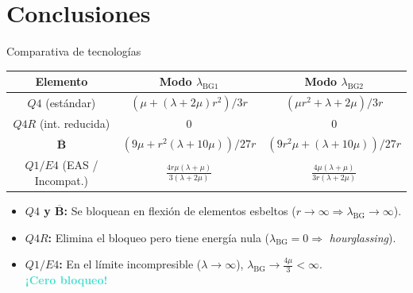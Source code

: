 \documentclass[10pt, aspectratio=43]{beamer}
\begin{document}
\section[Conclusiones]{Conclusiones}
\begin{frame}{Comparativa de tecnologías}
\begin{uicard}[title=Resumen de rigideces frente a flexión ($\lambda_{\text{BG}}$), top=2pt, bottom=3pt, left=6pt, right=6pt, attach title to upper={\par\vspace{0.05cm}}]
    \scriptsize
    \centering
    \renewcommand{\arraystretch}{1.8} %
    \begin{tabular}{||c|c|c||}
      \hline \hline
      Elemento & Modo $\lambda_{\text{BG1}}$ & Modo $\lambda_{\text{BG2}}$ \\ \hline \hline
      $Q4$ (estándar) & $(\mu + (\lambda+2\mu)r^2)/3r$ & $(\mu r^2 + \lambda+2\mu)/3r$ \\ \hline
      $Q4R$ (int. reducida) & $0$ & $0$ \\ \hline
      $\overline{\bm{B}}$ & $(9\mu + r^2(\lambda+10\mu))/27r$ & $(9r^2\mu + (\lambda+10\mu))/27r$ \\ \hline
      $Q1/E4$ (EAS / Incompat.) & $\frac{4r\mu(\lambda+\mu)}{3(\lambda+2\mu)}$ & $\frac{4\mu(\lambda+\mu)}{3r(\lambda+2\mu)}$ \\
      \hline \hline
    \end{tabular}
  \end{uicard}

  \vspace{0.05cm}

  \begin{uicard}[title=Diagnóstico final de rendimiento, top=2pt, bottom=3pt, left=6pt, right=6pt, attach title to upper={\par\vspace{0.05cm}}]
    \footnotesize
    \begin{itemize}
      \item \textbf{$Q4$ y $\overline{\bm{B}}$:} Se bloquean en flexión de elementos esbeltos ($r \to \infty \Rightarrow \lambda_{\text{BG}} \to \infty$).
      \item \textbf{$Q4R$:} Elimina el bloqueo pero tiene energía nula ($\lambda_{\text{BG}} = 0 \Rightarrow$ \emph{hourglassing}).
      \item \textbf{$Q1/E4$:} En el límite incompresible ($\lambda \to \infty$), $\lambda_{\text{BG}} \to \frac{4\mu}{3} < \infty$. \\
      \textbf{\textcolor{Turquoise}{¡Cero bloqueo!}}
    \end{itemize}
  \end{uicard}
\end{frame}
\end{document}
